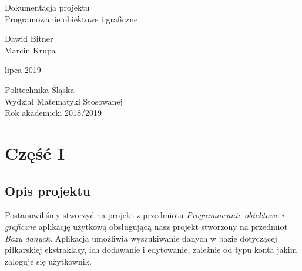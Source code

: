 \documentclass[12pt,a4paper]{article}
\begin{document}
    \begin{titlepage}
       \begin{center}
           \vspace*{1cm}

           {\fontsize{23}{25}\selectfont Dokumentacja projektu\\Programowanie obiektowe i graficzne}

            \vspace{1.0cm}

            {\fontsize{17}{18}\selectfont Dawid Bitner \\ Marcin Krupa}

            \vspace{0.4cm}

            {\fontsize{12}{13} lipca 2019}

            \vfill
            \vspace{0.8cm}

            {\fontsize{13}{14}\selectfont Politechnika Śląska\\Wydział Matematyki Stosowanej\\Rok akademicki 2018/2019}

       \end{center}
    \end{titlepage}
	\newpage
	\tableofcontents
	\newpage
	\section{Część I}
	\subsection{Opis projektu}
        Postanowiliśmy stworzyć na projekt z przedmiotu \textit{Programowanie obiektowe i graficzne} aplikację użytkową obsługującą nasz projekt stworzony na przedmiot \textit{Bazy danych}. Aplikacja umożliwia wyszukiwanie danych w bazie dotyczącej piłkarskiej ekstraklasy, ich dodawanie i edytowanie, zależnie od typu konta jakim zaloguje się użytkownik.
\end{document}
